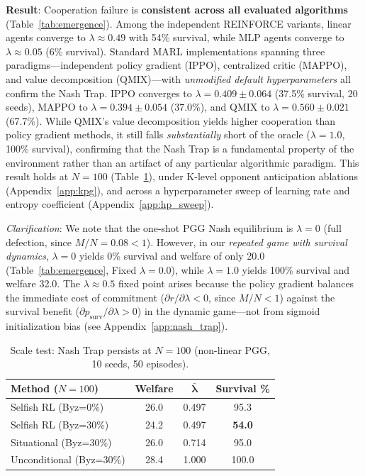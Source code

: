 \documentclass{article}
\begin{document}
\textbf{Result}: Cooperation failure is \textbf{consistent across all evaluated algorithms} (Table~\ref{tab:emergence}).
Among the independent REINFORCE variants, linear agents converge to $\lambda \approx 0.49$ with 54\% survival, while MLP agents converge to $\lambda \approx 0.05$ (6\% survival).
Standard MARL implementations spanning three paradigms---independent policy gradient (IPPO), centralized critic (MAPPO), and value decomposition (QMIX)---with \emph{unmodified default hyperparameters} all confirm the Nash Trap.
IPPO converges to $\lambda = 0.409 \pm 0.064$ (37.5\% survival, 20 seeds), MAPPO to $\lambda = 0.394 \pm 0.054$ (37.0\%), and QMIX to $\lambda = 0.560 \pm 0.021$ (67.7\%).
While QMIX's value decomposition yields higher cooperation than policy gradient methods, it still falls \emph{substantially} short of the oracle ($\lambda = 1.0$, 100\% survival), confirming that the Nash Trap is a fundamental property of the environment rather than an artifact of any particular algorithmic paradigm.
This result holds at $N=100$ (Table~\ref{tab:scale}), under K-level opponent anticipation ablations (Appendix~\ref{app:kpg}), and across a hyperparameter sweep of learning rate and entropy coefficient (Appendix~\ref{app:hp_sweep}).

\noindent\textit{Clarification}: We note that the one-shot PGG Nash equilibrium is $\lambda=0$ (full defection, since $M/N = 0.08 < 1$).
However, in our \emph{repeated game with survival dynamics}, $\lambda=0$ yields 0\% survival and welfare of only 20.0 (Table~\ref{tab:emergence}, Fixed $\lambda=0.0$), while $\lambda=1.0$ yields 100\% survival and welfare 32.0.
The $\lambda \approx 0.5$ fixed point arises because the policy gradient balances the immediate cost of commitment ($\partial r/\partial \lambda < 0$, since $M/N < 1$) against the survival benefit ($\partial p_{\text{surv}}/\partial \lambda > 0$) in the dynamic game---not from sigmoid initialization bias (see Appendix~\ref{app:nash_trap}).

\begin{table}[t]
\centering
\caption{Scale test: Nash Trap persists at $N{=}100$ (non-linear PGG, 10 seeds, 50 episodes).}
\label{tab:scale}
\begin{tabular}{lccc}
\toprule
\textbf{Method ($N{=}100$)} & \textbf{Welfare} & $\boldsymbol{\bar{\lambda}}$ & \textbf{Survival \%} \\
\midrule
Selfish RL (Byz=0\%) & 26.0 & 0.497 & 95.3 \\
Selfish RL (Byz=30\%) & 24.2 & 0.497 & \textbf{54.0} \\
\midrule
Situational (Byz=30\%) & 26.0 & 0.714 & 95.0 \\
Unconditional (Byz=30\%) & 28.4 & 1.000 & 100.0 \\
\bottomrule
\end{tabular}
\end{table}
\end{document}
